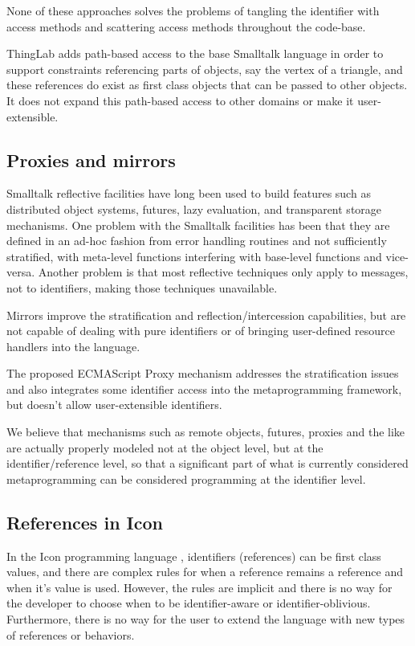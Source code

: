 \documentclass[preprint,authoryear]{llncs}
\begin{document}
None of these approaches solves the problems of tangling the identifier with access methods and 
scattering access methods throughout the code-base.  



ThingLab\cite{thinglab}  adds path-based access to the base Smalltalk language in order to support
constraints referencing parts of objects, say the vertex of a triangle, and these
references do exist as first class objects that can be passed to other objects.
   It does not
expand this path-based access to other domains or make it user-extensible.


\subsection{Proxies and mirrors}

Smalltalk reflective facilities \cite{reflective-st} have long been used to build
features such as distributed object systems, futures, lazy evaluation, and
transparent storage mechanisms.  One problem with the Smalltalk facilities
has been that they are defined in an ad-hoc fashion from error handling routines
and not sufficiently stratified, with meta-level functions
interfering with base-level functions and vice-versa.  Another problem is that
most reflective techniques only apply to messages, not to identifiers, making 
those techniques unavailable.

Mirrors \cite{mirrors} improve the stratification and
reflection/intercession capabilities, but are not capable of dealing with pure
identifiers or of bringing user-defined resource handlers into the language.

The proposed ECMAScript Proxy mechanism \cite{VanCutsemMiller} addresses
the stratification issues and also integrates some identifier access into the 
metaprogramming framework, but doesn't allow user-extensible identifiers.

We believe that mechanisms such as remote objects, futures, proxies and the like
are actually properly modeled not at the object level, but at the identifier/reference
level, so that a significant part of what is currently considered metaprogramming
can be considered programming at the identifier level.

\subsection{References in Icon}

In the Icon programming language \cite{IconRef} , identifiers (references) can be first class values,
and there are complex rules for when a reference remains a reference and when
it's value is used.  However, the rules are implicit and there is no way for the 
developer to choose when to be identifier-aware or identifier-oblivious.  Furthermore,
there is no way for the user to extend the language with new types of references 
or behaviors.
\end{document}
